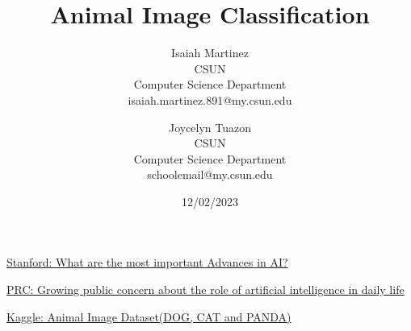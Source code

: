 \documentclass[a4paper,10pt]{article}
\begin{document}
%
  \title{Animal Image Classification}
  \author{
  Isaiah Martinez \\ CSUN \\ Computer Science Department \\ isaiah.martinez.891@my.csun.edu
  \and
  Joycelyn Tuazon \\ CSUN \\ Computer Science Department \\ schoolemail@my.csun.edu}
          
  \date{12/02/2023}

  \maketitle
   
  \tableofcontents
 

  \newpage

  
  
  
  
  


  \begin{thebibliography}{}

     \href{https://ai100.stanford.edu/gathering-strength-gathering-storms-one-hundred-year-study-artificial-intelligence-ai100-2021-1/sq2#:~:text=In%20the%20last%20five%20years,and%20integration%20of%20vision%20and}{Stanford: What are the most important Advances in AI?}

     \href{https://www.pewresearch.org/short-reads/2023/08/28/growing-public-concern-about-the-role-of-artificial-intelligence-in-daily-life/}{PRC: Growing public concern about the role of artificial intelligence in daily life}
  
     \href{https://www.kaggle.com/datasets/ashishsaxena2209/animal-image-datasetdog-cat-and-panda}{Kaggle: Animal Image Dataset(DOG, CAT and PANDA)}

  
  \end{thebibliography}
\end{document}
